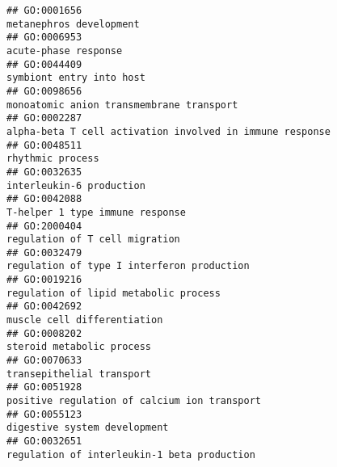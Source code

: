\documentclass[
]{article}
\begin{document}
\begin{verbatim}
## GO:0001656                                                                                                                          metanephros development
## GO:0006953                                                                                                                             acute-phase response
## GO:0044409                                                                                                                         symbiont entry into host
## GO:0098656                                                                                                         monoatomic anion transmembrane transport
## GO:0002287                                                                                         alpha-beta T cell activation involved in immune response
## GO:0048511                                                                                                                                 rhythmic process
## GO:0032635                                                                                                                         interleukin-6 production
## GO:0042088                                                                                                                  T-helper 1 type immune response
## GO:2000404                                                                                                                   regulation of T cell migration
## GO:0032479                                                                                                       regulation of type I interferon production
## GO:0019216                                                                                                            regulation of lipid metabolic process
## GO:0042692                                                                                                                      muscle cell differentiation
## GO:0008202                                                                                                                        steroid metabolic process
## GO:0070633                                                                                                                        transepithelial transport
## GO:0051928                                                                                                     positive regulation of calcium ion transport
## GO:0055123                                                                                                                     digestive system development
## GO:0032651                                                                                                      regulation of interleukin-1 beta production

\end{verbatim}
\end{document}

